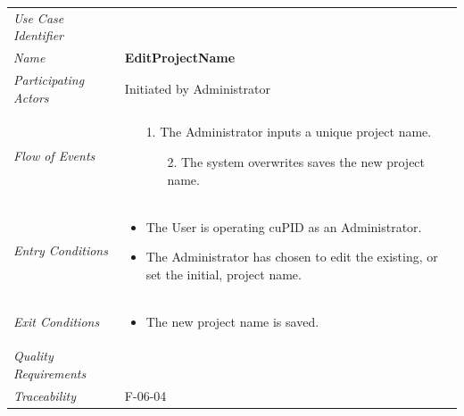 \documentclass[12pt,letterpaper]{article}
\begin{document}
\begin{center}
	\begin{tabu} to 
		\toprule
		Use Case Identifier & \editprojectname{} \\
		Name & {\bf EditProjectName} \\
		Participating Actors & Initiated by Administrator \\
		Flow of Events & 
		\begin{minipage}[t]{\linewidth}
		    \begin{enumerate}
			    \item[1.] The Administrator inputs a unique project name.
			    \begin{enumerate}
			        \item[2.] The system overwrites saves the new project name.
			    \end{enumerate}
			\end{enumerate}
		\end{minipage} \\

		Entry Conditions &
		\begin{minipage}[t]{\linewidth}
			\begin{itemize}
			    \item The User is operating cuPID as an Administrator.
			    \item The Administrator has chosen to edit the existing, or set the initial, project name.
	        \end{itemize}
		\end{minipage} \\

		Exit Conditions &
		\begin{minipage}[t]{\linewidth}
			\begin{itemize}
			    \item The new project name is saved.
	        \end{itemize}
		\end{minipage} \\

		Quality Requirements & \\

		Traceability & F-06-04 \\
		\toprule
	\end{tabu}
\end{center}
\end{document}
